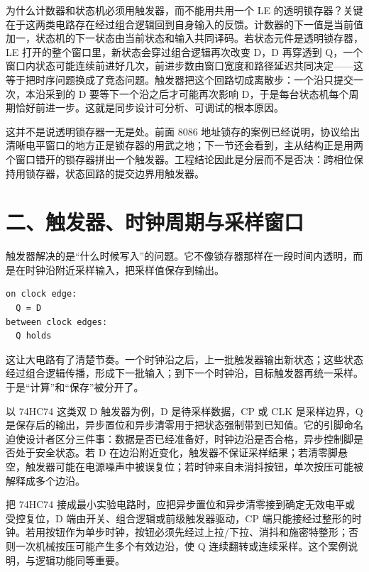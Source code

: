 为什么计数器和状态机必须用触发器，而不能用共用一个 LE 的透明锁存器？关键在于这两类电路存在经过组合逻辑回到自身输入的反馈。计数器的下一值是当前值加一，状态机的下一状态由当前状态和输入共同译码。若状态元件是透明锁存器，LE 打开的整个窗口里，新状态会穿过组合逻辑再次改变 D，D 再穿透到 Q，一个窗口内状态可能连续前进好几次，前进步数由窗口宽度和路径延迟共同决定——这等于把时序问题换成了竞态问题。触发器把这个回路切成离散步：一个沿只提交一次，本沿采到的 D 要等下一个沿之后才可能再次影响 D，于是每台状态机每个周期恰好前进一步。这就是同步设计可分析、可调试的根本原因。

这并不是说透明锁存器一无是处。前面 8086 地址锁存的案例已经说明，协议给出清晰电平窗口的地方正是锁存器的用武之地；下一节还会看到，主从结构正是用两个窗口错开的锁存器拼出一个触发器。工程结论因此是分层而不是否决：跨相位保持用锁存器，状态回路的提交边界用触发器。

\section{二、触发器、时钟周期与采样窗口}

触发器解决的是“什么时候写入”的问题。它不像锁存器那样在一段时间内透明，而是在时钟沿附近采样输入，把采样值保存到输出。

\begin{lstlisting}
on clock edge:
  Q = D
between clock edges:
  Q holds
\end{lstlisting}

这让大电路有了清楚节奏。一个时钟沿之后，上一批触发器输出新状态；这些状态经过组合逻辑传播，形成下一批输入；到下一个时钟沿，目标触发器再统一采样。于是“计算”和“保存”被分开了。

以 74HC74 这类双 D 触发器为例，D 是待采样数据，CP 或 CLK 是采样边界，Q 是保存后的输出，异步置位和异步清零用于把状态强制带到已知值。它的引脚命名迫使设计者区分三件事：数据是否已经准备好，时钟边沿是否合格，异步控制脚是否处于安全状态。若 D 在边沿附近变化，触发器不保证采样结果；若清零脚悬空，触发器可能在电源噪声中被误复位；若时钟来自未消抖按钮，单次按压可能被解释成多个边沿。

\begin{chipcase}
把 74HC74 接成最小实验电路时，应把异步置位和异步清零接到确定无效电平或受控复位，D 端由开关、组合逻辑或前级触发器驱动，CP 端只能接经过整形的时钟。若用按钮作为单步时钟，按钮必须先经过上拉/下拉、消抖和施密特整形；否则一次机械按压可能产生多个有效边沿，使 Q 连续翻转或连续采样。这个案例说明，与逻辑功能同等重要。
\end{chipcase}

